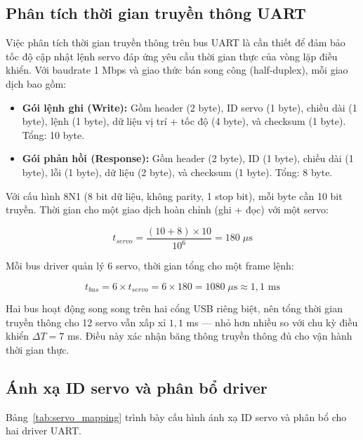 \subsection{Phân tích thời gian truyền thông UART}

Việc phân tích thời gian truyền thông trên bus UART là cần thiết để đảm bảo tốc độ cập nhật lệnh servo đáp ứng yêu cầu thời gian thực của vòng lặp điều khiển. Với baudrate 1 Mbps và giao thức bán song công (half-duplex), mỗi giao dịch bao gồm:

\begin{itemize}
    \item \textbf{Gói lệnh ghi (Write):} Gồm header (2 byte), ID servo (1 byte), chiều dài (1 byte), lệnh (1 byte), dữ liệu vị trí + tốc độ (4 byte), và checksum (1 byte). Tổng: 10 byte.
    \item \textbf{Gói phản hồi (Response):} Gồm header (2 byte), ID (1 byte), chiều dài (1 byte), lỗi (1 byte), dữ liệu (2 byte), và checksum (1 byte). Tổng: 8 byte.
\end{itemize}

Với cấu hình 8N1 (8 bit dữ liệu, không parity, 1 stop bit), mỗi byte cần 10 bit truyền. Thời gian cho một giao dịch hoàn chỉnh (ghi + đọc) với một servo:

\begin{equation}
    t_{servo} = \frac{(10 + 8) \times 10}{10^6} = 180 \; \mu\text{s}
\end{equation}

Mỗi bus driver quản lý 6 servo, thời gian tổng cho một frame lệnh:

\begin{equation}
    t_{bus} = 6 \times t_{servo} = 6 \times 180 = 1080 \; \mu\text{s} \approx 1{,}1 \text{ ms}
\end{equation}

Hai bus hoạt động song song trên hai cổng USB riêng biệt, nên tổng thời gian truyền thông cho 12 servo vẫn xấp xỉ $1{,}1$ ms --- nhỏ hơn nhiều so với chu kỳ điều khiển $\Delta T = 7$ ms. Điều này xác nhận băng thông truyền thông đủ cho vận hành thời gian thực.

\subsection{Ánh xạ ID servo và phân bổ driver}

Bảng~\ref{tab:servo_mapping} trình bày cấu hình ánh xạ ID servo và phân bổ cho hai driver UART.

